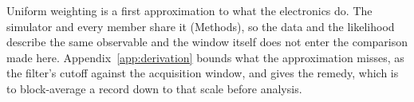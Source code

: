 Uniform weighting is a first approximation to what the electronics do. The simulator and every
member share it (Methods), so the data and the likelihood describe the same observable and the
window itself does not enter the comparison made here.
Appendix~\ref{app:derivation} bounds what the approximation misses, as the filter's cutoff
against the acquisition window, and gives the remedy, which is to block-average a record down to
that scale before analysis.

